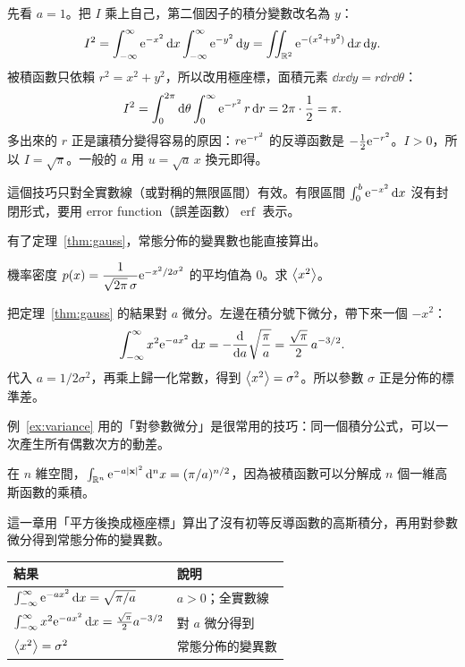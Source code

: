 \documentclass[10pt,a4paper]{article}
\begin{document}
\begin{derivation}[平方後換成極座標]
先看 $a=1$。把 $I$ 乘上自己，第二個因子的積分變數改名為 $y$：
\[
  I^2=\int_{-\infty}^{\infty}\mathrm{e}^{-x^2}\mathop{}\!\mathrm{d} x\int_{-\infty}^{\infty}\mathrm{e}^{-y^2}\mathop{}\!\mathrm{d} y
     =\iint_{\mathbb R^2}\mathrm{e}^{-(x^2+y^2)}\mathop{}\!\mathrm{d} x\mathop{}\!\mathrm{d} y .
\]
被積函數只依賴 $r^2=x^2+y^2$，所以改用極座標，面積元素 $\dd x\dd y=r\dd r\dd\theta$：
\[
  I^2=\int_0^{2\pi}\mathop{}\!\mathrm{d}\theta\int_0^\infty \mathrm{e}^{-r^2}\,r\mathop{}\!\mathrm{d} r
     =2\pi\cdot\frac12=\pi .
\]
多出來的 $r$ 正是讓積分變得容易的原因：$r\mathrm{e}^{-r^2}$ 的反導函數是 $-\tfrac12\mathrm{e}^{-r^2}$。$I>0$，所以 $I=\sqrt\pi$。一般的 $a$ 用 $u=\sqrt a\,x$ 換元即得。
\end{derivation}


\begin{note}
這個技巧只對全實數線（或對稱的無限區間）有效。有限區間 $\int_0^b\mathrm{e}^{-x^2}\mathop{}\!\mathrm{d} x$ 沒有封閉形式，要用 error function（誤差函數）$\operatorname{erf}$ 表示。
\end{note}


有了定理~\ref{thm:gauss}，常態分佈的變異數也能直接算出。

\begin{example}[常態分佈的變異數]
\label{ex:variance}
機率密度 $p(x)=\dfrac{1}{\sqrt{2\pi}\,\sigma}\mathrm{e}^{-x^2/2\sigma^2}$ 的平均值為 0。求 $\left\langle x^2\right\rangle$。
\end{example}
\begin{solution}
把定理~\ref{thm:gauss} 的結果對 $a$ 微分。左邊在積分號下微分，帶下來一個 $-x^2$：
\[
  \int_{-\infty}^{\infty}x^2\mathrm{e}^{-ax^2}\mathop{}\!\mathrm{d} x=-\frac{\mathop{}\!\mathrm{d}}{\mathop{}\!\mathrm{d} a}\sqrt{\frac{\pi}{a}}=\frac{\sqrt\pi}{2}\,a^{-3/2} .
\]
代入 $a=1/2\sigma^2$，再乘上歸一化常數，得到 $\left\langle x^2\right\rangle=\sigma^2$。所以參數 $\sigma$ 正是分佈的標準差。
\end{solution}

例~\ref{ex:variance} 用的「對參數微分」是很常用的技巧：同一個積分公式，可以一次產生所有偶數次方的動差。

\begin{extension}[多維推廣]
在 $n$ 維空間，$\int_{\mathbb R^n}\mathrm{e}^{-a|\mathbf x|^2}\mathop{}\!\mathrm{d}^n x=(\pi/a)^{n/2}$，因為被積函數可以分解成 $n$ 個一維高斯函數的乘積。
\end{extension}


這一章用「平方後換成極座標」算出了沒有初等反導函數的高斯積分，再用對參數微分得到常態分佈的變異數。

\begin{center}
\begin{tabular}{@{}ll@{}}
\toprule
結果 & 說明 \\
\midrule
$\int_{-\infty}^{\infty}\mathrm{e}^{-ax^2}\mathop{}\!\mathrm{d} x=\sqrt{\pi/a}$ & $a>0$；全實數線 \\
$\int_{-\infty}^{\infty}x^2\mathrm{e}^{-ax^2}\mathop{}\!\mathrm{d} x=\tfrac{\sqrt\pi}{2}a^{-3/2}$ & 對 $a$ 微分得到 \\
$\left\langle x^2\right\rangle=\sigma^2$ & 常態分佈的變異數 \\
\bottomrule
\end{tabular}
\end{center}
\end{document}
